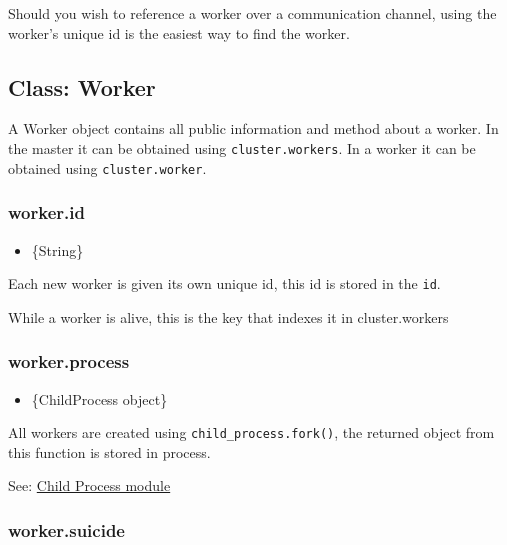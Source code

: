 Should you wish to reference a worker over a communication channel,
using the worker's unique id is the easiest way to find the worker.

\begin{Shaded}
\begin{Highlighting}[]
\NormalTok{(}\NormalTok{, }
   \NormalTok{[id];}
\NormalTok{\});}
\end{Highlighting}
\end{Shaded}

\subsection{Class: Worker}

A Worker object contains all public information and method about a
worker. In the master it can be obtained using \texttt{cluster.workers}.
In a worker it can be obtained using \texttt{cluster.worker}.

\subsubsection{worker.id}

\begin{itemize}
\item
  \{String\}
\end{itemize}

Each new worker is given its own unique id, this id is stored in the
\texttt{id}.

While a worker is alive, this is the key that indexes it in
cluster.workers

\subsubsection{worker.process}

\begin{itemize}
\item
  \{ChildProcess object\}
\end{itemize}

All workers are created using \texttt{child\_process.fork()}, the
returned object from this function is stored in process.

See: \href{child\_process.html}{Child Process module}

\subsubsection{worker.suicide}

